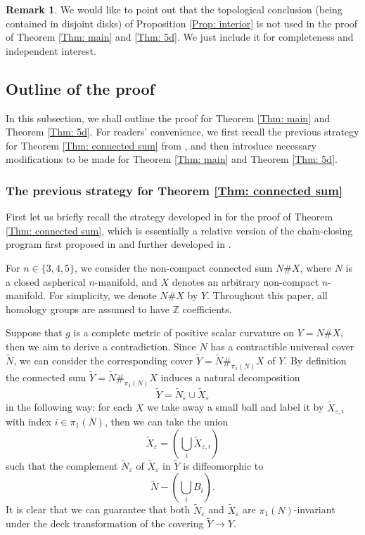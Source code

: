 \documentclass[11pt, reqno]{amsart}
\numberwithin{equation}{section}
\theoremstyle{definition}
\newtheorem{remark}[theorem]{Remark}
\newcommand{\ve}{\varepsilon}
\newcommand{\ti}[1]{\tilde{#1}}
\begin{document}
\begin{remark}
We would like to point out that the topological conclusion (being contained in disjoint disks) of Proposition \ref{Prop: interior} is not used in the proof of Theorem \ref{Thm: main} and \ref{Thm: 5d}. We just include it for completeness and independent interest.
\end{remark}




\subsection{Outline of the proof}
In this subsection, we shall outline the proof for Theorem \ref{Thm: main} and Theorem \ref{Thm: 5d}. For readers' convenience, we first recall the previous strategy for Theorem \ref{Thm: connected sum} from \cite{CCZ23}, and then introduce necessary modifications to be made for Theorem \ref{Thm: main} and Theorem \ref{Thm: 5d}.
\subsubsection{The previous strategy for Theorem \ref{Thm: connected sum}}

First let us briefly recall the strategy developed in \cite{CCZ23} for the proof of Theorem \ref{Thm: connected sum}, which is essentially a relative version of the chain-closing program first proposed in \cite{SY87} and further developed in \cite{CL20}.


For $n \in \{3,4,5\}$, we consider the non-compact connected sum $N\#X$,
where $N$ is a closed aspherical $n$-manifold, and $X$ denotes an arbitrary non-compact $n$-manifold. For simplicity, we denote $N\#X$ by $Y$. Throughout this paper, all homology groups are assumed to have $\mathbb{Z}$ coefficients.

Suppose that $g$ is a complete metric of positive scalar curvature on $Y = N \# X$, then we aim to derive a contradiction. Since $N$ has a contractible universal cover $\tilde N$, we can consider the corresponding cover $\tilde Y=\tilde N\#_{\pi_1(N)}X$ of $Y$. By definition the connected sum  $\tilde Y=\tilde N\#_{\pi_1(N)}X$ induces a natural decomposition $$
\tilde Y=\tilde N_{\ve}\cup \ti X_{\ve}$$
in the following way: for each $X$ we take away a small ball and label it by $\tilde X_{\ve, i}$ with index $i\in \pi_1(N)$, then we can take the union
$$\tilde X_{\ve}=\left(\bigcup_i \tilde X_{\ve,i}\right)$$
such that the complement $\tilde N_{\ve}$ of $\tilde X_{\ve}$ in $\tilde Y$ is diffeomorphic to
$$
\tilde N-\left(\bigcup_i B_i\right).
$$
It is clear that we can guarantee that both $\tilde N_{\ve}$ and $\tilde X_{\ve}$ are $\pi_1(N)$-invariant under the deck transformation of the covering $\tilde Y\to Y$.
\end{document}
